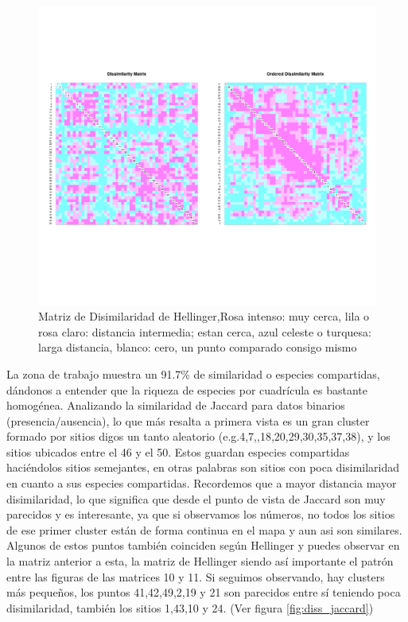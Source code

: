\documentclass[11pt,]{article}
\begin{document}
\begin{figure}
\centering
\includegraphics{diss_hellinger.png}
\caption{\label{fig:diss_hellinger}Matriz de Disimilaridad de
Hellinger,Rosa intenso: muy cerca, lila o rosa claro: distancia
intermedia; estan cerca, azul celeste o turquesa: larga distancia,
blanco: cero, un punto comparado consigo mismo}
\end{figure}

La zona de trabajo muestra un 91.7\% de similaridad o especies
compartidas, dándonos a entender que la riqueza de especies por
cuadrícula es bastante homogénea. Analizando la similaridad de Jaccard
para datos binarios (presencia/ausencia), lo que más resalta a primera
vista es un gran cluster formado por sitios digos un tanto aleatorio
(e.g.4,7,,18,20,29,30,35,37,38), y los sitios ubicados entre el 46 y el
50. Estos guardan especies compartidas haciéndolos sitios semejantes, en
otras palabras son sitios con poca disimilaridad en cuanto a sus
especies compartidas. Recordemos que a mayor distancia mayor
disimilaridad, lo que significa que desde el punto de vista de Jaccard
son muy parecidos y es interesante, ya que si observamos los números, no
todos los sitios de ese primer cluster están de forma continua en el
mapa y aun asi son similares. Algunos de estos puntos también coinciden
según Hellinger y puedes observar en la matriz anterior a esta, la
matriz de Hellinger siendo así importante el patrón entre las figuras de
las matrices 10 y 11. Si seguimos observando, hay clusters más pequeños,
los puntos 41,42,49,2,19 y 21 son parecidos entre sí teniendo poca
disimilaridad, también los sitios 1,43,10 y 24. (Ver figura
\ref{fig:diss_jaccard})
\end{document}
